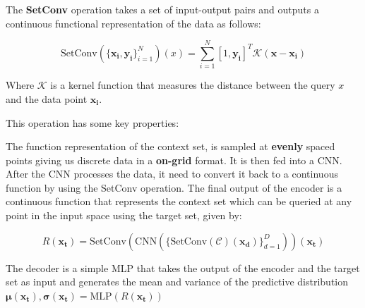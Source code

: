 \documentclass[../../main.tex]{subfiles}
\begin{document}
The \textbf{SetConv} operation takes a set of input-output pairs and outputs a continuous functional representation of the data as follows:

\begin{equation}
	\label{eq:setconv}
	\text{SetConv}(\{\bm{x_i}, \bm{y_i}\}_{i=1}^{N})(x) = \sum_{i=1}^{N} [1, \bm{y_i}] ^ T \mathcal{K}(\bm{x} - \bm{x_i})
\end{equation}

Where $\mathcal{K}$ is a kernel function that measures the distance between the query $x$ and the data point $\bm{x_i}$.

This operation has some key properties:


The function representation of the context set, is sampled at \textbf{evenly} spaced points giving us discrete data in a \textbf{on-grid} format. It is then fed into a CNN. After the CNN processes the data, it need to convert it back to a continuous function by using the SetConv operation. The final output of the encoder is a continuous function that represents the context set which can be queried at any point in the input space using the target set, given by:

\begin{equation}
	R(\bm{x_t}) = \text{SetConv}(\text{CNN}(\{\text{SetConv}(\mathcal{C})(\bm{x_d})\}_{d=1}^{D}))(\bm{x_t})
\end{equation}

The decoder is a simple MLP that takes the output of the encoder and the target set as input and generates the mean and variance of the predictive distribution $\bm{\mu}(\bm{x_t}), \bm{\sigma}(\bm{x_t}) = \text{MLP}(R(\bm{x_t}))$


\ifSubfilesClassLoaded{%
    \printbibliography{}
}{} 
\end{document}
